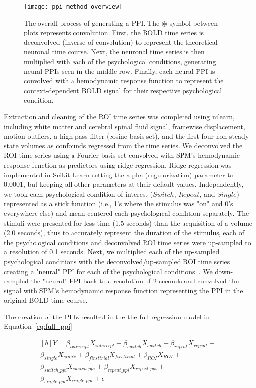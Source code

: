 \documentclass[phd,figures,tables,ackpage,abstractpage,publicabstractpage]{uithesis}
\begin{document}
\begin{figure}[H]
  \centering
  \texttt{[image: ppi\_method\_overview]}
  \caption[Example computation of several PPIs]{
    The overall process of generating a PPI.
    The $\circledast$ symbol between plots represents convolution.
    First, the BOLD time series is deconvolved (inverse of convolution)
    to represent the theoretical neuronal time course.
    Next, the neuronal time series is then multiplied with each of the psychological
    conditions, generating neural PPIs seen in the middle row.
    Finally, each neural PPI is convolved with a hemodynamic response function
    to represent the context-dependent BOLD signal for their respective psychological
    condition.
  }
  \label{fig:ppi_method_overview}
\end{figure}

Extraction and cleaning of the ROI time series was completed using nilearn,
including white matter and cerebral spinal fluid signal, framewise displacement,
motion outliers, a high pass filter (cosine basis set), and the first four non-steady state
volumes as confounds regressed from the time series.
We deconvolved the ROI time series using a Fourier basis set convolved with
SPM's hemodynamic response function as predictors using ridge regression.
Ridge regression was implemented in Scikit-Learn setting the alpha (regularization)
parameter to 0.0001, but keeping all other parameters at their default values.
Independently, we took each psychological condition of interest ($Switch$, $Repeat$, and $Single$)
represented as a stick function (i.e., 1's where the stimulus was "on" and 0's everywhere else)
and mean centered each psychological condition separately.
The stimuli were presented for less time (1.5 seconds) than the acquisition of
a volume (2.0 seconds), thus to accurately represent the duration
of the stimulus, each of the psychological conditions and deconvolved ROI time series were up-sampled to
a resolution of 0.1 seconds.
Next, we multiplied each of the up-sampled psychological conditions with the deconvolved/up-sampled
ROI time series creating a "neural" PPI for each of the
psychological conditions~\cite{McLaren2012}.
We down-sampled the "neural" PPI back to a resolution of 2 seconds and convolved the signal with
SPM's hemodynamic response function representing the PPI in the original BOLD time-course.

The creation of the PPIs resulted in the the full regression model in Equation~\ref{eq:full_ppi}

\begin{equation}
	\begin{multlined}[b]
    Y = \beta_{intercept}X_{intercept} + \beta_{switch}X_{switch} + \beta_{repeat}X_{repeat} + \\
	      \beta_{single}X_{single} + \beta_{firsttrial}X_{firsttrial} + \beta_{ROI}X_{ROI} + \\
		\beta_{switch\_ppi}X_{switch\_ppi} + \beta_{repeat\_ppi}X_{repeat\_ppi} + \\
		\beta_{single\_ppi} X_{single\_ppi} + \epsilon
  \end{multlined}
  \label{eq:full_ppi}
\end{equation}
\end{document}

